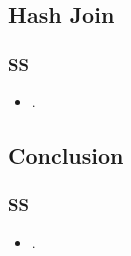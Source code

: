 \subsection{Hash Join}

\begin{frame}
\frametitle{SS}

\begin{itemize}
\item .
\end{itemize}

\end{frame}



\subsection{Conclusion}

\begin{frame}
\frametitle{SS}

\begin{itemize}
\item .
\end{itemize}

\end{frame}